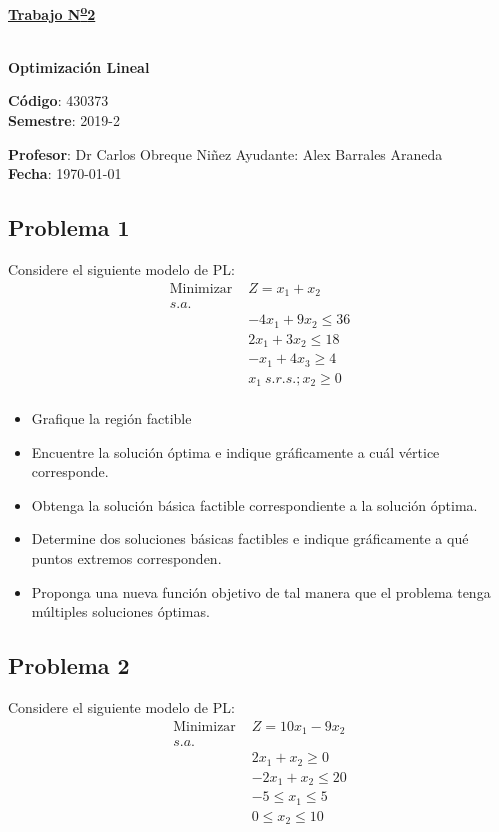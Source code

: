 \documentclass[letterpaper]{article}
\begin{document}
\vspace*{0.5\baselineskip}
\begin{center}
\begin{Large}
\textbf{\underline{Trabajo N\textsuperscript{\underline{o}}2}}
\end{Large}\\
\vspace*{0.5\baselineskip}
\textbf{Optimización Lineal} \\
\vspace*{0.5\baselineskip}
\begin{footnotesize}
\textbf{Código}: 430373\\
\textbf{Semestre}: 2019-2
\end{footnotesize}
\end{center}

\noindent \textbf{Profesor}: Dr Carlos Obreque Niñez  \hfill Ayudante: Alex Barrales Araneda\\
\noindent \textbf{Fecha}: \today

\subsection*{Problema 1}
Considere el siguiente modelo de PL:
\begin{align*}
\mbox{Minimizar }&Z = x_1 + x_2 \\
s.a.\\
&-4x_1 + 9x_2 \leq 36\\
&2x_1 + 3x_2 \leq 18\\
&-x_1 + 4x_3  \geq 4\\
&x_1 \: s.r.s.;x_2 \geq 0\\
\end{align*}

\begin{itemize}
\item Grafique la región factible
\item Encuentre la solución óptima e indique gráficamente a cuál vértice corresponde.
\item Obtenga la solución básica factible correspondiente a la solución óptima.
\item Determine dos soluciones básicas factibles e indique gráficamente a qué puntos extremos corresponden.
\item Proponga una nueva función objetivo de tal manera que el problema tenga múltiples soluciones óptimas. 
\end{itemize}

\subsection*{Problema 2}
Considere el siguiente modelo de PL:
\begin{align*}
\mbox{Minimizar }&Z = 10x_1 - 9x_2 \\
s.a.\\
&2x_1 + x_2 \geq 0\\
&-2x_1 + x_2 \leq 20\\
&-5 \leq x_1 \leq 5\\
&0 \leq x_2 \leq 10\\
\end{align*}
\end{document}
